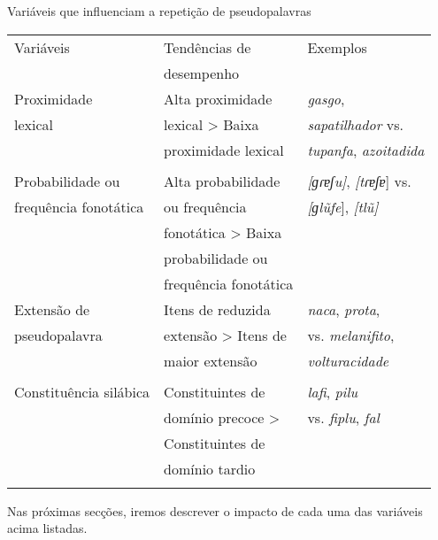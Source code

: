 \documentclass[output=paper,colorlinks,citecolor=brown,booklanguage=portuguese]{langscibook}
\begin{document}
\begin{Tabela}
\caption{Variáveis que influenciam a repetição de pseudopalavras}
\label{tab:cap9tab1}


\begin{tabularx}{\textwidth}{QQQ}
\lsptoprule
 Variáveis&	Tendências de &	Exemplos      \\
& desempenho &\\
 \midrule
 Proximidade &	Alta proximidade & \emph{gasgo},\\
 lexical & lexical > Baixa & \emph{sapatilhador}  vs.\\
 & proximidade lexical& \emph{tupanfa}, \emph{azoitadida}\\ &&\citep{Ribeiro2011}\\
\tablevspace
Probabilidade ou & Alta probabilidade& \emph{[ɡɾɐʃu]}, \emph{[tɾɐʃɐ}] vs.\\
frequência fonotática	& ou frequência & \emph{[ɡlũfe}],\emph{ [tlũ]
}\\
& fonotática > Baixa & \citep{Coutinho2014}\\
&probabilidade ou&\\
&frequência fonotática&	\\
\tablevspace
Extensão de &  Itens de reduzida& \emph{naca}, \emph{prota},\\
pseudopalavra& extensão > Itens de & vs. \emph{melanifito},\\
& maior extensão& \emph{volturacidade}\\
&&\citep{CruzSantos2009}\\
\tablevspace
Constituência silábica&	Constituintes de& \emph{lafi}, \emph{pilu}\\
& domínio precoce > & vs. \emph{fiplu}, \emph{fal}\\
&Constituintes de & \citep{Catarino2019}\\
&domínio tardio&	\\
\lspbottomrule
\end{tabularx}
\end{Tabela}


Nas próximas secções, iremos descrever o impacto de cada uma das variáveis acima listadas.
\end{document}
